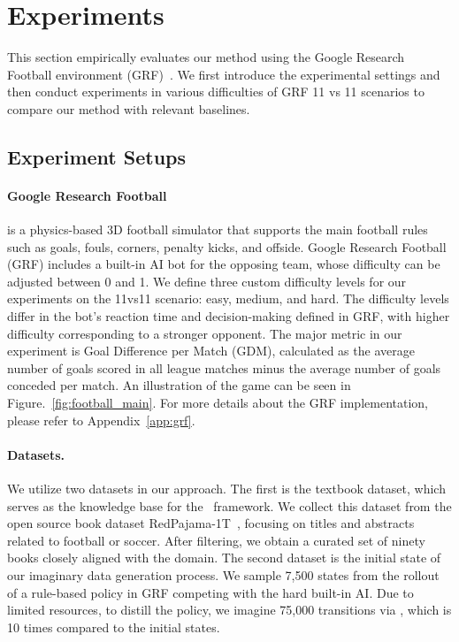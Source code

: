 

\vspace{-1mm}
\section{Experiments}
\vspace{-2mm}

This section empirically evaluates our method using the Google Research Football environment (GRF)~\citep{kurach2020google}. We first introduce the experimental settings and then conduct experiments in various difficulties of GRF 11 vs 11 scenarios to compare our method with relevant baselines.

\subsection{Experiment Setups}

\paragraph{Google Research Football}\citep{kurach2020google} is a physics-based 3D football simulator that supports the main football rules such as goals, fouls, corners, penalty kicks, and offside. Google Research Football (GRF) includes a built-in AI bot for the opposing team, whose difficulty can be adjusted between 0 and 1. We define three custom difficulty levels for our experiments on the 11vs11 scenario: easy, medium, and hard. The difficulty levels differ in the bot's reaction time and decision-making defined in GRF, with higher difficulty corresponding to a stronger opponent. The major metric in our experiment is Goal Difference per Match (GDM), calculated as the average number of goals scored in all league matches minus the average number of goals conceded per match. An illustration of the game can be seen in Figure.~\ref{fig:football_main}.  For more details about the GRF implementation, please refer to Appendix~\ref{app:grf}.




\paragraph{Datasets.} We utilize two datasets in our approach. The first is the textbook dataset, which serves as the knowledge base for the \topic~framework. We collect this dataset from the open source book dataset RedPajama-1T~\citep{together2023redpajama}, focusing on titles and abstracts related to football or soccer. After filtering, we obtain a curated set of ninety books closely aligned with the domain. The second dataset is the initial state of our imaginary data generation process. 
We sample 7,500 states from the rollout of a rule-based policy in GRF competing with the hard built-in AI. Due to limited resources, to distill the policy, we imagine 75,000 transitions via \algo, which is 10 times compared to the initial states.

